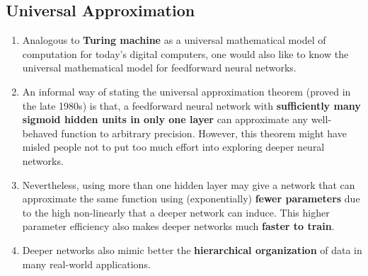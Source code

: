 \documentclass[11pt]{article}
\begin{document}
\subsection{Universal Approximation}
\begin{enumerate}
\item Analogous to \textbf{Turing machine} as a universal mathematical model of computation for today's digital computers, one would also like to know the universal mathematical model for feedforward neural networks.
\item An informal way of stating the universal approximation theorem (proved in the late 1980s) is that, a feedforward neural network with \textbf{sufficiently many sigmoid hidden units in only one layer} can approximate any well-behaved function to arbitrary precision. However, this theorem might have misled people not to put too much effort into exploring deeper neural networks.
\item Nevertheless, using more than one hidden layer may give a network that can approximate the same function using (exponentially) \textbf{fewer parameters} due to the high non-linearly that a deeper network can induce. This higher parameter efficiency also makes deeper networks much \textbf{faster to train}.
\item Deeper networks also mimic better the \textbf{hierarchical organization} of data in many real-world applications.
\end{enumerate}
\end{document}
